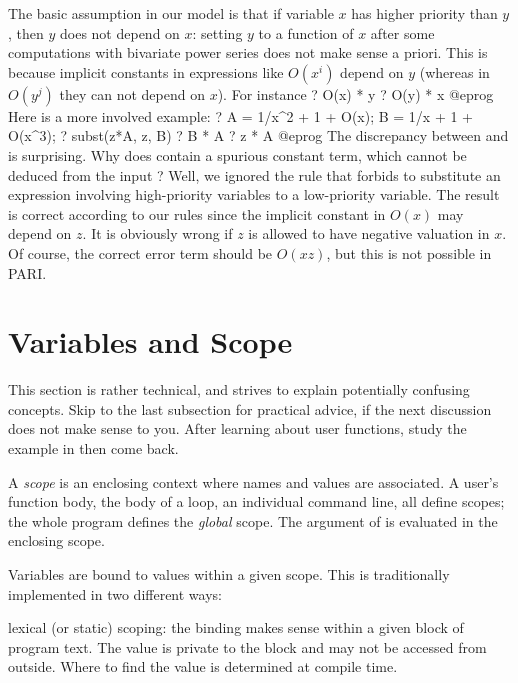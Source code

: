 The basic assumption in our model is that if variable $x$ has higher
priority than $y$, then $y$ does not depend on $x$: setting $y$ to a
function of $x$ after some computations with bivariate power series does
not make sense a priori. This is because implicit constants in
expressions like $O(x^i)$ depend on $y$ (whereas in $O(y^j)$ they can not
depend on $x$). For instance
\bprog
  ? O(x) * y
  ? O(y) * x
@eprog\noindent
Here is a more involved example:
\bprog
  ? A = 1/x^2 + 1 + O(x); B = 1/x + 1 + O(x^3);
  ? subst(z*A, z, B)
  ? B * A
  ? z * A
@eprog\noindent
The discrepancy between  and  is surprising. Why does
 contain a spurious constant term, which cannot be
deduced from the input ? Well, we ignored the rule that forbids to
substitute an expression involving high-priority variables
to a low-priority variable. The result  is correct according to
our rules since the implicit constant in $O(x)$ may depend on $z$. It is
obviously wrong if $z$ is allowed to have negative valuation in $x$. Of
course, the correct error term should be $O(xz)$, but this is not
possible in PARI.

\section{Variables and Scope}\label{se:scope}
This section is rather technical, and strives to explain potentially
confusing concepts. Skip to the last subsection for practical advice, if the
next discussion does not make sense to you. After learning about user
functions, study the example in  then come back.


A \emph{scope} is an enclosing context where names and values are associated.
A user's function body, the body of a loop, an individual command line, all
define scopes; the whole program defines the \emph{global} scope. The
argument of  is evaluated in the enclosing scope.

Variables are bound to values within a given scope. This is traditionally
implemented in two different ways:

\item{} lexical (or static) scoping: the binding makes
sense within a given block of program text. The value is private to the block
and may not be accessed from outside. Where to find the value is determined
at compile time.

